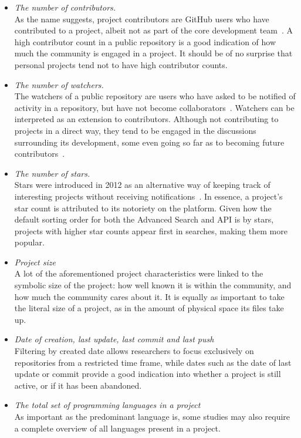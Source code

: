 \begin{itemize}
    \item \textit{The number of contributors.}
    \\As the name suggests, project contributors are GitHub users who have contributed to a project, albeit not as part of the core development team~\cite{GITHUBHELP}. A high contributor count in a public repository is a good indication of how much the community is engaged in a project. It should be of no surprise that personal projects tend not to have high contributor counts.
    \item \textit{The number of watchers.}
    \\The watchers of a public repository are users who have asked to be notified of activity in a repository, but have not become collaborators~\cite{METRICSWATCHERS}. Watchers can be interpreted as an extension to contributors. Although not contributing to projects in a direct way, they tend to be engaged in the discussions surrounding its development, some even going so far as to becoming future contributors~\cite{WATCHERS14}.
    \item \textit{The number of stars.}
    \\Stars were introduced in 2012 as an alternative way of keeping track of interesting projects without receiving notifications~\cite{STARS}. In essence, a project's star count is attributed to its notoriety on the platform. Given how the default sorting order for both the Advanced Search and API is by stars, projects with higher star counts appear first in searches, making them more popular.
    \item \textit{Project size}
    \\A lot of the aforementioned project characteristics were linked to the symbolic size of the project: how well known it is within the community, and how much the community cares about it. It is equally as important to take the literal size of a project, as in the amount of physical space its files take up.
    \item \textit{Date of creation, last update, last commit and last push}
    \\Filtering by created date allows researchers to focus exclusively on repositories from a restricted time frame, while dates such as the date of last update or commit provide a good indication into whether a project is still active, or if it has been abandoned.
    \item \textit{The total set of programming languages in a project}
    \\As important as the predominant language is, some studies may also require a complete overview of all languages present in a project.

\end{itemize}
